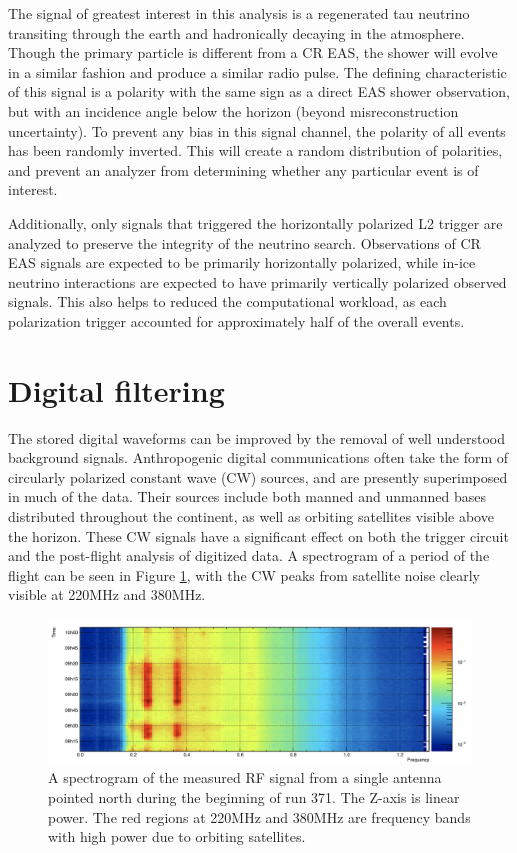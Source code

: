 		The signal of greatest interest in this analysis is a regenerated tau neutrino transiting through the earth and hadronically decaying in the atmosphere.  Though the primary particle is different from a CR EAS, the shower will evolve in a similar fashion and produce a similar radio pulse.  The defining characteristic of this signal is a polarity with the same sign as a direct EAS shower observation, but with an incidence angle below the horizon (beyond misreconstruction uncertainty).  To prevent any bias in this signal channel, the polarity of all events has been randomly inverted.  This will create a random distribution of polarities, and prevent an analyzer from determining whether any particular event is of interest.
		
		Additionally, only signals that triggered the horizontally polarized L2 trigger are analyzed to preserve the integrity of the neutrino search.  Observations of CR EAS signals are expected to be primarily horizontally polarized, while in-ice neutrino interactions are expected to have primarily vertically polarized observed signals.  This also helps to reduced the computational workload, as each polarization trigger accounted for approximately half of the overall events.
		
			
		
\section{Digital filtering}%
	The stored digital waveforms can be improved by the removal of well understood background signals.  Anthropogenic digital communications often take the form of circularly polarized constant wave (CW) sources, and are presently superimposed in much of the data.  Their sources include both manned and unmanned bases distributed throughout the continent, as well as orbiting satellites visible above the horizon.  These CW signals have a significant effect on both the trigger circuit and the post-flight analysis of digitized data. A spectrogram of a period of the flight can be seen in Figure \ref{fig:spectrogram}, with the CW peaks from satellite noise clearly visible at 220MHz and 380MHz.

\begin{figure}
	\centering
	\includegraphics[width=\textwidth]{figures/spectrogram}
	\caption{A spectrogram of the measured RF signal from a single antenna pointed north during the beginning of run 371.  The Z-axis is linear power.  The red regions at 220MHz and 380MHz are frequency bands with high power due to orbiting satellites.} 
	\label{fig:spectrogram}
\end{figure}


